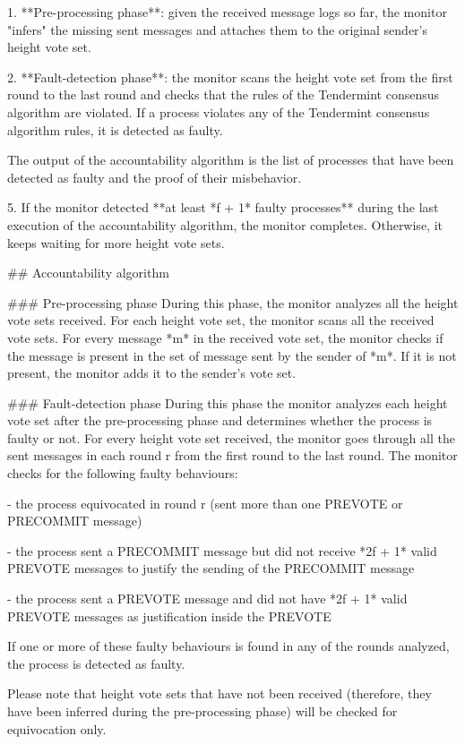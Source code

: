 \documentclass[a4paper,11pt,oneside]{report}
\begin{document}
\begin{markdown}
    1. **Pre-processing phase**: given the received message logs so far, the monitor "infers" the missing sent messages and attaches them to the original sender's height vote set.

    2. **Fault-detection phase**: the monitor scans the height vote set from the first round to the last round and checks that the rules of the Tendermint consensus algorithm are violated. If a process violates any of the Tendermint consensus algorithm rules, it is detected as faulty. 

    The output of the accountability algorithm is the list of processes that have been detected as faulty and the proof of their misbehavior.
  
5. If the monitor detected **at least *f + 1* faulty processes** during the last execution of the accountability algorithm, the monitor completes. Otherwise, it keeps waiting for more height vote sets.

## Accountability algorithm

### Pre-processing phase
During this phase, the monitor analyzes all the height vote sets received. 
For each height vote set, the monitor scans all the received vote sets. 
For every message *m* in the received vote set, the monitor checks if the message is present in the set of message sent by the sender of *m*. If it is not present, the monitor adds it to the sender's vote set.   

### Fault-detection phase
During this phase the monitor analyzes each height vote set after the pre-processing phase and determines whether the process is faulty or not.
For every height vote set received, the monitor goes through all the sent messages in each round r from the first round to the last round. The monitor checks for the following faulty behaviours:

- the process equivocated in round r (sent more than one PREVOTE or PRECOMMIT message)

- the process sent a PRECOMMIT message but did not receive *2f + 1* valid PREVOTE messages to justify the sending of the PRECOMMIT message

- the process sent a PREVOTE message and did not have *2f + 1* valid PREVOTE messages as justification inside the PREVOTE

If one or more of these faulty behaviours is found in any of the rounds analyzed, the process is detected as faulty.

Please note that height vote sets that have not been received (therefore, they have been inferred during the pre-processing phase) will be checked for equivocation only.


\end{markdown}
\end{document}
